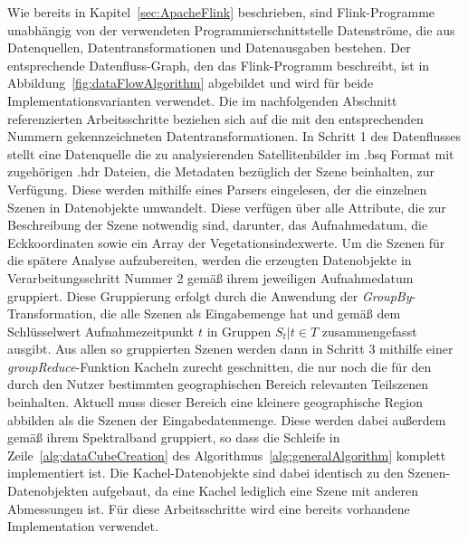 Wie bereits in Kapitel~\ref{sec:ApacheFlink} beschrieben, sind Flink-Programme unabhängig von der verwendeten Programmierschnittstelle Datenströme, die aus Datenquellen, Datentransformationen und Datenausgaben bestehen. Der entsprechende Datenfluss-Graph, den das Flink-Programm beschreibt, ist in Abbildung~\ref{fig:dataFlowAlgorithm} abgebildet und wird für beide Implementationsvarianten verwendet. Die im nachfolgenden Abschnitt referenzierten Arbeitsschritte beziehen sich auf die mit den entsprechenden Nummern gekennzeichneten Datentransformationen. In Schritt 1 des Datenflusses stellt eine Datenquelle die zu analysierenden Satellitenbilder im .bsq Format mit zugehörigen .hdr Dateien, die Metadaten bezüglich der Szene beinhalten, zur Verfügung. Diese werden mithilfe eines Parsers eingelesen, der die einzelnen Szenen in Datenobjekte umwandelt. Diese verfügen über alle Attribute, die zur Beschreibung der Szene notwendig sind, darunter, das Aufnahmedatum, die Eckkoordinaten sowie ein Array der Vegetationsindexwerte. Um die Szenen für die spätere Analyse aufzubereiten, werden die erzeugten Datenobjekte in Verarbeitungsschritt Nummer 2 gemäß ihrem jeweiligen Aufnahmedatum gruppiert. Diese Gruppierung erfolgt durch die Anwendung der \textit{GroupBy}-Transformation, die alle Szenen als Eingabemenge hat und gemäß dem Schlüsselwert Aufnahmezeitpunkt $t$ in Gruppen $S_t | t \in T$ zusammengefasst ausgibt. Aus allen so gruppierten Szenen werden dann in Schritt 3 mithilfe einer \textit{groupReduce}-Funktion Kacheln zurecht geschnitten, die nur noch die für den durch den Nutzer bestimmten geographischen Bereich relevanten Teilszenen beinhalten. Aktuell muss dieser Bereich eine kleinere geographische Region abbilden als die Szenen der Eingabedatenmenge. Diese werden dabei außerdem gemäß ihrem Spektralband gruppiert, so dass die Schleife in Zeile~\ref{alg:dataCubeCreation} des Algorithmus~\ref{alg:generalAlgorithm} komplett implementiert ist. Die Kachel-Datenobjekte sind dabei identisch zu den Szenen-Datenobjekten aufgebaut, da eine Kachel lediglich eine Szene mit anderen Abmessungen ist. Für diese Arbeitsschritte wird eine bereits vorhandene Implementation verwendet.
